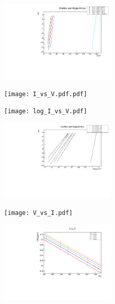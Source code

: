 \documentclass[10pt,twocolumn]{article}
\begin{document}
\begin{figure}[H] %
  \centering
  \includegraphics[width=0.5\textwidth]{coefficente_etatot.pdf} %
  \label{fig:I}
\end{figure}
\begin{figure}[H] %
  \centering
  \texttt{[image: I\_vs\_V.pdf.pdf]} %
  \label{fig:II}
\end{figure}
\begin{figure}[H] %
  \centering
  \texttt{[image: log\_I\_vs\_V.pdf]} %
  \label{fig:III}
\end{figure}
\begin{figure}[H] %
  \centering
  \includegraphics[width=0.5\textwidth]{scala_semilogaritmica.pdf} %
  \label{fig:I_V_}
\end{figure}
\begin{figure}[H] %
  \centering
  \texttt{[image: V\_vs\_I.pdf]} %
  \label{fig:V}
\end{figure}
\begin{figure}[H] %
  \centering
  \includegraphics[width=0.5\textwidth]{V_vs_T_lim.pdf} %
  \label{fig:V_I_}
\end{figure}
\end{document}
